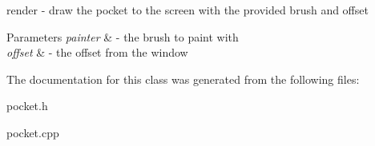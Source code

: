 render -\/ draw the pocket to the screen with the provided brush and offset 


\begin{DoxyParams}{Parameters}
{\em painter} & -\/ the brush to paint with \\
\hline
{\em offset} & -\/ the offset from the window \\
\hline
\end{DoxyParams}


The documentation for this class was generated from the following files\+:\begin{DoxyCompactItemize}
\item 
pocket.\+h\item 
pocket.\+cpp\end{DoxyCompactItemize}
